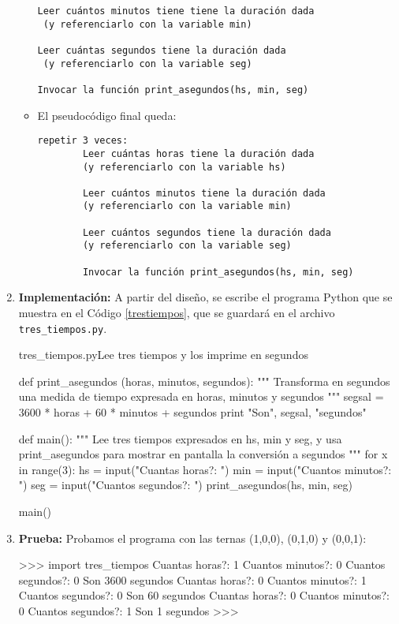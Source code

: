 \begin{enumerate}
\begin{itemize}
\begin{verbatim}
Leer cuántos minutos tiene tiene la duración dada
 (y referenciarlo con la variable min)

Leer cuántas segundos tiene la duración dada
 (y referenciarlo con la variable seg)

Invocar la función print_asegundos(hs, min, seg)
\end{verbatim}

\item El pseudocódigo final queda:

\begin{verbatim}
repetir 3 veces:
        Leer cuántas horas tiene la duración dada
        (y referenciarlo con la variable hs)

        Leer cuántos minutos tiene la duración dada
        (y referenciarlo con la variable min)

        Leer cuántos segundos tiene la duración dada
        (y referenciarlo con la variable seg)

        Invocar la función print_asegundos(hs, min, seg)
\end{verbatim}

\end{itemize}
\item {\bf Implementación:} A partir del diseño, se escribe el programa
Python que se muestra en el Código \ref{trestiempos}, que se guardará
en el archivo \verb!tres_tiempos.py!.

\begin{codigo}{\label{trestiempos} tres\_tiempos.py}{Lee tres tiempos y los imprime en segundos}
\begin{codigo-python}
def print_asegundos (horas, minutos, segundos):
    """ Transforma en segundos una medida de tiempo expresada en
        horas, minutos y segundos """
    segsal = 3600 * horas + 60 * minutos + segundos
    print "Son", segsal, "segundos"

def main():
	""" Lee tres tiempos expresados en hs, min y seg, y usa
		print_asegundos para mostrar en pantalla la conversión a
        segundos """
    for x in range(3):
        hs = input("Cuantas horas?: ")
        min = input("Cuantos minutos?: ")
        seg = input("Cuantos segundos?: ")
        print_asegundos(hs, min, seg)

main()
\end{codigo-python}
\end{codigo}

\item {\bf Prueba: } Probamos el programa con las ternas (1,0,0), (0,1,0) y
(0,0,1):

\begin{codigo-python-sn}
>>> import tres_tiempos
Cuantas horas?: 1
Cuantos minutos?: 0
Cuantos segundos?: 0
Son 3600 segundos
Cuantas horas?: 0
Cuantos minutos?: 1
Cuantos segundos?: 0
Son 60 segundos
Cuantas horas?: 0
Cuantos minutos?: 0
Cuantos segundos?: 1
Son 1 segundos
>>>
\end{codigo-python-sn}
\end{enumerate}

